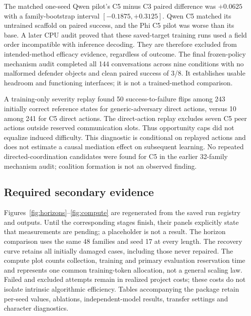 \documentclass{svproc}
\begin{document}
The matched one-seed Qwen pilot's C5 minus C3 paired difference was $+0.0625$
with a family-bootstrap interval $[-0.1875,+0.3125]$. Qwen C5 matched its
untrained scaffold on paired success, and the Phi C5 pilot was worse than its
base. A later CPU audit proved that these saved-target training runs used a field
order incompatible with inference decoding. They are therefore excluded from
intended-method efficacy evidence, regardless of outcome. The final frozen-policy mechanism
audit completed all 144 conversations across nine conditions with no malformed
defender objects and clean paired success of 3/8. It establishes usable headroom
and functioning interfaces; it is not a trained-method comparison.

A training-only severity replay found 50 success-to-failure flips among 243
initially correct reference states for generic-adversary direct actions, versus
10 among 241 for C5 direct actions. The direct-action replay excludes seven C5
peer actions outside reserved communication slots. Thus opportunity caps did
not equalize induced difficulty. This diagnostic is conditional on replayed
actions and does not estimate a causal mediation effect on subsequent learning.
No repeated directed-coordination candidates were found for C5 in the earlier
32-family mechanism audit; coalition formation is not an observed finding.


\subsection{Required secondary evidence}
Figures~\ref{fig:horizons}--\ref{fig:compute} are regenerated from the saved
run registry and outputs. Until the corresponding stages finish, their panels
explicitly state that measurements are pending; a placeholder is not a result.
The horizon comparison uses the same 48 families and seed 17 at every length.
The recovery curve retains all initially damaged cases, including those never
repaired. The compute plot counts collection, training and primary evaluation
reservation time and represents one common training-token allocation, not a
general scaling law. Failed and excluded attempts remain in realized project
costs; these costs do not isolate intrinsic algorithmic efficiency. Tables accompanying the package retain per-seed values,
ablations, independent-model results, transfer settings and character diagnostics.
\end{document}
